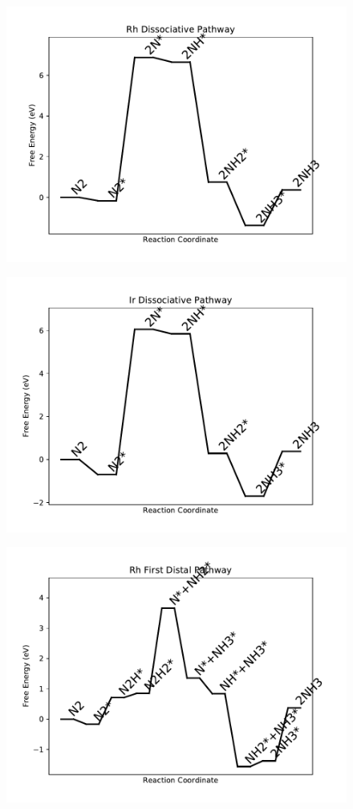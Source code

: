 \begin{figure}
\centering
\includegraphics[width=0.8\linewidth]{data/plots/Rh_dissociative.pdf}
\end{figure}

\begin{figure}
\centering
\includegraphics[width=0.8\linewidth]{data/plots/Ir_dissociative.pdf}
\end{figure}

\begin{figure}
\centering
\includegraphics[width=0.8\linewidth]{data/plots/Rh_distal_1.pdf}
\end{figure}

